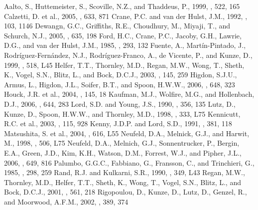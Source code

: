 \documentclass[manuscript]{aastex}
\begin{document}
\begin{thebibliography}{}
 Aalto, S., Huttemeister, S., Scoville, N.Z., and Thaddeus, P., 1999, \aj, 522, 165
 Calzetti, D. et al., 2005, \apj, 633, 871
 Crane, P.C. and van der Hulst, J.M., 1992, \aj, 103, 1146
 Dewangn, G.C., Griffiths, R.E., Choudhury, M., Miyaji, T., and Schurch, N.J., 2005, \apj, 635, 198
 Ford, H.C., Crane, P.C., Jacoby, G.H., Lawrie, D.G., and van der Hulst, J.M., 1985, \apj, 293, 132
 Fuente, A., Mart\'{i}n-Pintado, J., Rodr\'{i}guez-Fern\'{a}ndez, N.J., Rodr\'{i}guez-Franco, A., de Vicente, P., and Kunze, D., 1999, \apj, 518, L45 
 Helfer, T.T., Thornley, M.D., Regan, M.W., Wong, T., Sheth, K., Vogel, S.N., Blitz, L., and Bock, D.C.J., 2003, \apjs, 145, 259
 Higdon, S.J.U., Armus, L., Higdon, J.L., Soifer, B.T., and Spoon, H.W.W., 2006, \apj, 648, 323
 Houck, J.R. et al., 2004, \apjs, 145, 18
 Kaufman, M.J., Wolfire, M.G., and Hollenbach, D.J., 2006, \apj, 644, 283 
 Lord, S.D. and Young, J.S., 1990, \apj, 356, 135
 Lutz, D., Kunze, D., Spoon, H.W.W., and Thornley, M.D., 1998, \aap, 333, L75
 Kennicutt, R.C. et al., 2003, \pasp, 115, 928
 Kenny, J.D.P. and Lord, S.D., 1991, \apj, 381, 118
 Matsushita, S. et al., 2004, \apj, 616, L55
 Neufeld, D.A., Melnick, G.J., and Harwit, M., 1998, \apj, 506, L75
 Neufeld, D.A., Melnich, G.J., Sonnentrucker, P., Bergin, E.A., Green, J.D., Kim, K.H., Watson, D.M., Forrest, W.J., and Pipher, J.L., 2006, \apj, 649, 816 
 Palumbo, G.G.C., Fabbiano, G., Fransson, C., and Trinchieri, G., 1985, \apj, 298, 259 
 Rand, R.J. and Kulkarni, S.R., 1990, \apj, 349, L43
 Regan, M.W., Thornley, M.D., Helfer, T.T., Sheth, K., Wong, T., Vogel, S.N., Blitz, L., and Bock, D.C.J., 2001, \apj, 561, 218
 Rigopoulou, D., Kunze, D., Lutz, D., Genzel, R., and Moorwood, A.F.M., 2002, \aap, 389, 374

\end{thebibliography}
\end{document}
